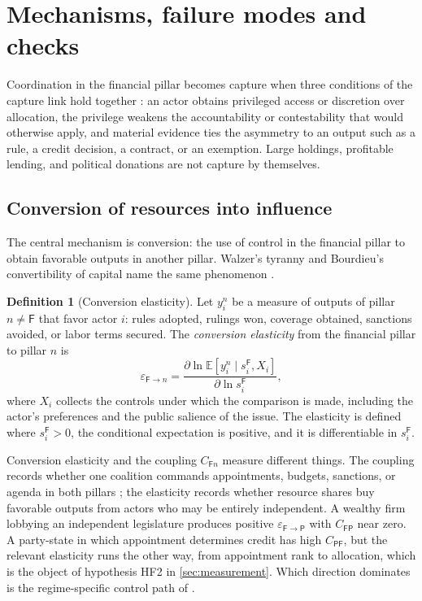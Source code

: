 \documentclass[11pt,letterpaper]{article}
\theoremstyle{definition}
\newtheorem{definition}[theorem]{Definition}
\theoremstyle{remark}
\newcommand{\pF}{\mathsf{F}}
\newcommand{\pP}{\mathsf{P}}
\newcommand{\E}{\mathbb{E}}
\begin{document}
\section{Mechanisms, failure modes and checks}
\label{sec:mechanisms}

Coordination in the financial pillar becomes capture when three conditions of the capture link hold together \citep{largo2026hbs}: an actor obtains privileged access or discretion over allocation, the privilege weakens the accountability or contestability that would otherwise apply, and material evidence ties the asymmetry to an output such as a rule, a credit decision, a contract, or an exemption. Large holdings, profitable lending, and political donations are not capture by themselves.

\subsection{Conversion of resources into influence}

The central mechanism is conversion: the use of control in the financial pillar to obtain favorable outputs in another pillar. Walzer's tyranny and Bourdieu's convertibility of capital name the same phenomenon \citep{walzer1983,bourdieu1989}.

\begin{definition}[Conversion elasticity]
\label{def:financial-power:conversion}
Let $y^{n}_i$ be a measure of outputs of pillar $n\neq\pF$ that favor actor $i$: rules adopted, rulings won, coverage obtained, sanctions avoided, or labor terms secured. The \emph{conversion elasticity} from the financial pillar to pillar $n$ is
\[
\varepsilon_{\pF\to n}=\frac{\partial\ln\E[y^{n}_i\mid s^{\pF}_i,X_i]}{\partial\ln s^{\pF}_i},
\]
where $X_i$ collects the controls under which the comparison is made, including the actor's preferences and the public salience of the issue. The elasticity is defined where $s^{\pF}_i>0$, the conditional expectation is positive, and it is differentiable in $s^{\pF}_i$.
\end{definition}

Conversion elasticity and the coupling $C_{\pF n}$ measure different things. The coupling records whether one coalition commands appointments, budgets, sanctions, or agenda in both pillars \citep{largo2026hbs}; the elasticity records whether resource shares buy favorable outputs from actors who may be entirely independent. A wealthy firm lobbying an independent legislature produces positive $\varepsilon_{\pF\to\pP}$ with $C_{\pF\pP}$ near zero. A party-state in which appointment determines credit has high $C_{\pP\pF}$, but the relevant elasticity runs the other way, from appointment rank to allocation, which is the object of hypothesis HF2 in \cref{sec:measurement}. Which direction dominates is the regime-specific control path of \citet{largo2026hbs}.
\end{document}
